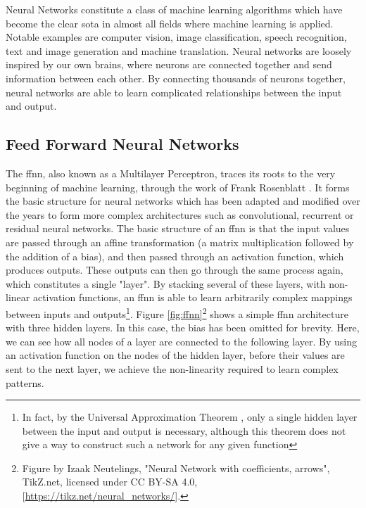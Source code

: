 \documentclass[UKenglish]{uiomasterthesis} %
\theoremstyle{definition}
\begin{document}
Neural Networks constitute a class of machine learning algorithms which have become the clear \ac{sota} in almost all fields where machine learning is applied. Notable examples are computer vision, image classification, speech recognition, text and image generation and machine translation. Neural networks are loosely inspired by our own brains, where neurons are connected together and send information between each other. By connecting thousands of neurons together, neural networks are able to learn complicated relationships between the input and output.

\subsection{Feed Forward Neural Networks}

The \ac{ffnn}, also known as a Multilayer Perceptron, traces its roots to the very beginning of machine learning, through the work of Frank Rosenblatt \cite{rosenblatt}. It forms the basic structure for neural networks which has been adapted and modified over the years to form more complex architectures such as convolutional, recurrent or residual neural networks. The basic structure of an \ac{ffnn} is that the input values are passed through an affine transformation (a matrix multiplication followed by the addition of a bias), and then passed through an activation function, which produces outputs. These outputs can then go through the same process again, which constitutes a single "layer". By stacking several of these layers, with non-linear activation functions, an \ac{ffnn} is able to learn arbitrarily complex mappings between inputs and outputs\footnote{In fact, by the Universal Approximation Theorem \cite{uat}, only a single hidden layer between the input and output is necessary, although this theorem does not give a way to construct such a network for any given function}. Figure \ref{fig:ffnn}\footnote{Figure by Izaak Neutelings, "Neural Network with coefficients, arrows", TikZ.net, licensed under CC BY-SA 4.0, [\url{https://tikz.net/neural\_networks/}].} shows a simple \ac{ffnn} architecture with three hidden layers. In this case, the bias has been omitted for brevity. Here, we can see how all nodes of a layer are connected to the following layer. By using an activation function on the nodes of the hidden layer, before their values are sent to the next layer, we achieve the non-linearity required to learn complex patterns.
\end{document}
